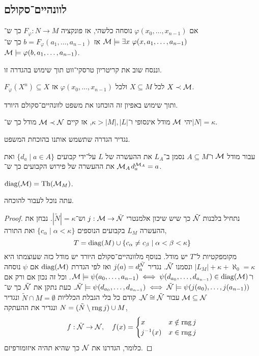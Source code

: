 \subsection{לוונהיים־סקולם}
\begin{definition}
	אם $\varphi(x_0, \ldots, x_{n - 1})$ נוסחה כלשהי,
	אז פונקציה $F_{\varphi} : N \to M$ כך ש־$\mathcal{M} \models \exists x\ \varphi(x, a_1, \ldots, a_{n - 1})$ אז $b = F_{\varphi}(a_1, \ldots, a_{n - 1})$ כך ש־$\mathcal{M} \models \varphi(b, a_1, \ldots, a_{n - 1})$.
\end{definition}
וננסח שוב את קריטריון טרסקי־ווט תוך שימוש בהגדרה זו.
\begin{theorem}
	$F_{\varphi}(X^n) \subseteq X$ לכל $X \subseteq M$ ולכל $\varphi(x_0, \ldots, x_{n - 1})$ אז $X \prec \mathcal{M}$.
\end{theorem}
ותוך שימוש באפיון זה הוכחנו את משפט לוונהיים־סקולם היורד.
\begin{theorem}
	יהי $\mathcal{M}$ מודל אינסופי ו־$\kappa > |M|, |L|$, אז קיים $\mathcal{M} \prec \mathcal{N}$ מודל כך ש־$|N| = \kappa$.
\end{theorem}
נגדיר הגדרה שתשמש אותנו בהוכחת המשפט.
\begin{definition}
	עבור מודל $\mathcal{M}$ ו־$A \subseteq M$ נסמן ב־$L_A$ את ההעשרה של $L$ על־ידי קבועים $\{ d_a \mid a \in A \}$ ואת $\mathcal{M}_A$ את ההעשרה של פירוש הקבועים כך ש־$d_a^{\mathcal{M}_A} = a$.
\end{definition}
\begin{notation}
	$\operatorname{diag}(\mathcal{M}) = \operatorname{Th}(\mathcal{M}_M)$.
\end{notation}
עתה נוכל לעבור להוכחה.
\begin{proof}
	נתחיל בלבנות $\tilde{\mathcal{N}}$ כך שיש שיכון אלמנטרי $j : \mathcal{M} \to \tilde{\mathcal{N}}$ וש־$|\tilde{N}| = \kappa$.
	נבחן את ההעשרה $L_M$ בקבועים הנוספים $\{ c_{\alpha} \mid \alpha < \kappa \}$ ואת התורה,
	\[
		T = \operatorname{diag}(M) \cup \{ c_{\alpha} \ne c_{\beta} \mid \alpha < \beta < \kappa \}
	\]
	מקומפקטיות ל־$T$ יש מודל.
	בנוסף מלוונהיים־סקולם היורד יש מודל כזה שעוצמתו היא $|L_M| + \kappa + \aleph_0 = \kappa$ ונסמנו $\tilde{\mathcal{N}}$.
	נגדיר $j(a) = d_a^{\tilde{\mathcal{N}}}$ ואז לפי הגדרת $\operatorname{diag}(\mathcal{M})$ אם $\psi$ נוסחה ו־$\mathcal{M} \models \psi(a_0, \ldots, a_{n - 1}) \iff \psi(d_{a_0}, \ldots, d_{a_{n - 1}}) \in \operatorname{diag}(\mathcal{M})$.
	וכל זה נכון אם ורק אם $\tilde{\mathcal{N}} \models \psi(d_{a_0}, \ldots, d_{a_{n - 1}}) \iff \tilde{\mathcal{N}} \models \psi(j(a_0), \ldots, j(a_{n - 1}))$.
	כעת נתקן את $\tilde{\mathcal{N}}$ כך ש־$\mathcal{M} \subseteq \mathcal{N}$ עבור $\mathcal{N} \cong \tilde{\mathcal{N}}$.
	קודם כל בלי הגבלת הכלליות $\tilde{N} \cap M = \emptyset$ ונגדיר $N = (\tilde{N} \setminus \operatorname{rng} j) \cup M$ ונגדיר את ההעתקה,
	\[
		f : \tilde{\mathcal{N}} \to \mathcal{N},
		\quad
		f(x) = \begin{cases}
			x & x \notin \operatorname{rng} j \\
			j^{-1}(x) & x \in \operatorname{rng} j
		\end{cases}
	\]
	כלומר, הגדרנו את $\mathcal{N}$ כך שהיא תהיה איזומורפיזם.
\end{proof}
